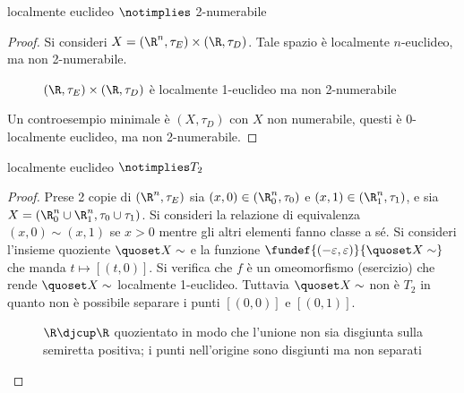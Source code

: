 \begin{prop}
localmente euclideo $\notimplies$ 2-numerabile
\end{prop}
\begin{proof} 
Si consideri $X = (\R^n, \tau _E) \times (\R, \tau _D)$.
Tale spazio è localmente $n$-euclideo, ma non 2-numerabile.

\begin{figure}
	\centering
	
	\caption{$(\R,\tau_E)\times(\R,\tau_D)$ è localmente 1-euclideo ma non 2-numerabile}
\end{figure}

Un controesempio minimale è $(X, \tau _D)$ con $X$ non numerabile, questi è 0-localmente euclideo, ma non 2-numerabile.
\end{proof}

\begin{prop}
localmente euclideo $\notimplies T_2$
\end{prop}
\begin{proof}
Prese 2 copie di $(\R^n, \tau _E)$ sia $(x,0) \in (\R^n_0, \tau _0)$  e $(x,1) \in (\R^n_1, \tau _1)$, e sia $X = (\R^n_0 \cup \R^n_1, \tau _0 \cup \tau _1)$. Si consideri la relazione di equivalenza $(x,0)\sim(x,1)$ se $x>0$ mentre gli altri elementi fanno classe a sé. Si consideri l'insieme quoziente $\quoset X\sim$ e la funzione $\fundef{(-\varepsilon,\varepsilon)}{\quoset X\sim}$ che manda $t \mapsto [(t,0)]$. Si verifica che $f$ è un omeomorfismo (esercizio) che rende $\quoset X\sim$ localmente 1-euclideo. Tuttavia $\quoset X\sim$ non è $T_2$ in quanto non è possibile separare i punti $[(0,0)]$ e $[(0,1)].$
\begin{figure}
	\centering
	
	\caption{$\R\djcup\R$ quozientato in modo che l'unione non sia disgiunta sulla semiretta positiva; i punti nell'origine sono disgiunti ma non separati}
\end{figure}
\end{proof}


